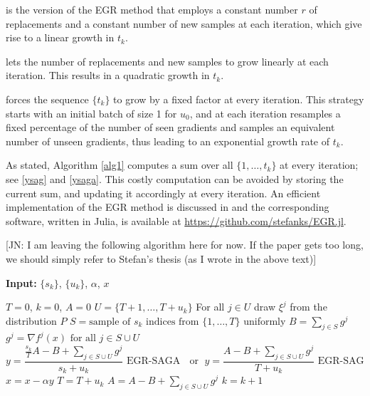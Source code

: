 \documentclass[11pt]{article}
\begin{document}
\medskip{} is the version of the EGR method that employs a constant number $r$ of replacements and a constant number of new samples at each iteration, which give rise to a linear growth in $t_k$.

\medskip{}  lets the number of replacements and new samples to grow linearly at each iteration. This results in a  quadratic growth in $t_k$.

\medskip{} forces the sequence $\{ t_k \}$ to grow by a fixed factor at every iteration. This strategy starts with an initial batch of size 1 for $u_0$, and at each iteration resamples a fixed percentage of the number of seen gradients and samples an equivalent number of unseen gradients, thus leading to an exponential growth rate of $t_k$. 
 
As stated, Algorithm \ref{alg1} computes a sum over all $\{1, \ldots ,t_k \} $ at every iteration; see \eqref{ysag} and \eqref{ysaga}. This costly computation can be avoided by storing the current sum, and updating it accordingly at every iteration. An efficient implementation of the EGR method is discussed in \cite{stefan-thesis} and the corresponding software, written in Julia, is available at \url{https://github.com/stefanks/EGR.jl}.

\bigskip
  
  {\color{blue}[JN: I am leaving the following algorithm here for now. If the paper gets too long, we should simply refer to Stefan's thesis (as I wrote in the above text)]}
  \begin{algorithm}
  	[H] 
  	\caption{EGR Algorithm (Implementation Version)}
  	\label{alg1-IMP}
  	{\bf Input:} $\{ s_k\} $, $\{ u_k \}$, $\alpha$, $x$
  	\begin{algorithmic}
  		[1] 
  		\State $T= 0$, $k = 0$, $A = 0$
  		\Loop 
  		\State $U =\{T+1,\ldots,T+u_k \}$ 
  		\State For all $j \in U$ draw $\xi^j$ from the distribution $P$ 
  		\State $S = \mbox{sample of } s_k \mbox{ indices from }\{ 1, \ldots ,T\}$ uniformly
  		\State $B = \sum_{j \in S} g^j$ 
  		\State $g^j =  \nabla f^j(x) \mbox{ for all } j \in S\cup U$
  		\State 
  		\begin{equation}
  			y =  \frac{\frac{s_k}{T} A - B +\sum_{j \in S\cup U}g^j}{s_k+u_k} \mbox{ EGR-SAGA } \; \mbox{ or } \; y =  \frac{A - B +\sum_{j \in S\cup U}g^j}{T+u_k} \mbox{ EGR-SAG } 
  		\end{equation}
  		\State $x  =  x - \alpha y$ 
  		\State $T =  T +u_k$ 
  		\State $A  =  A - B+ \sum_{j \in S\cup U}g^j$ 
  		\State $k = k+1$ 
  		\EndLoop 
  	\end{algorithmic}
  \end{algorithm}
  
\end{document}
